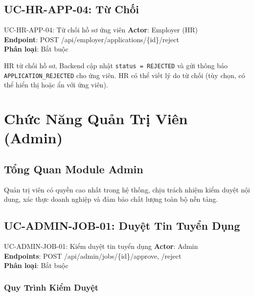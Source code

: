 \documentclass[12pt, a4paper]{report}
\begin{document}
\section{UC-HR-APP-04: Từ Chối}

\begin{requirementbox}{UC-HR-APP-04: Từ chối hồ sơ ứng viên}
\textbf{Actor}: Employer (HR) \\
\textbf{Endpoint}: POST /api/employer/applications/\{id\}/reject \\
\textbf{Phân loại}: Bắt buộc
\end{requirementbox}

HR từ chối hồ sơ, Backend cập nhật \texttt{status = REJECTED} và gửi thông báo \texttt{APPLICATION\_REJECTED} cho ứng viên. HR có thể viết lý do từ chối (tùy chọn, có thể hiển thị hoặc ẩn với ứng viên).

\chapter{Chức Năng Quản Trị Viên (Admin)}

\section{Tổng Quan Module Admin}

Quản trị viên có quyền cao nhất trong hệ thống, chịu trách nhiệm kiểm duyệt nội dung, xác thực doanh nghiệp và đảm bảo chất lượng toàn bộ nền tảng.

\section{UC-ADMIN-JOB-01: Duyệt Tin Tuyển Dụng}

\begin{requirementbox}{UC-ADMIN-JOB-01: Kiểm duyệt tin tuyển dụng}
\textbf{Actor}: Admin \\
\textbf{Endpoints}: POST /api/admin/jobs/\{id\}/approve, /reject \\
\textbf{Phân loại}: Bắt buộc
\end{requirementbox}

\subsection{Quy Trình Kiểm Duyệt}
\end{document}
